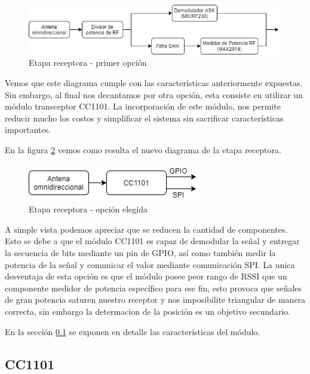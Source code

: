 \begin{figure}[htb]
	\centering
	\includegraphics[scale=0.6]{images/Opcion1.png}
    \caption{Etapa receptora - primer opción}
	\label{EtapaReceptora1}
\end{figure}


Vemos que este diagrama cumple con las características anteriormente expuestas. Sin embargo, al final nos decantamos por otra opción, 
esta consiste en utilizar un módulo transceptor CC1101. La incorporación de este módulo, nos permite reducir mucho los costos y simplificar
el sistema sin sacrificar características importantes. \par
En la figura \ref{EtapaReceptora2} vemos como resulta el nuevo diagrama de la etapa receptora. \par

\begin{figure}[htb]
	\centering
	\includegraphics[scale=0.6]{images/Opcion2.png}
    \caption{Etapa receptora - opción elegida}
	\label{EtapaReceptora2}
\end{figure}

A simple vista podemos apreciar que se reducen la cantidad de componentes. Esto se debe a que el módulo CC1101 es capaz de demodular la señal y
entregar la secuencia de bits mediante un pin de GPIO, así como también medir la potencia de la señal y comunicar el valor mediante comunicación SPI.
La unica desventaja de esta opción es que el módulo posee peor rango de RSSI que un componente medidor de potencia específico para ese fin,
esto provoca que señales de gran potencia saturen nuestro receptor y nos imposibilite triangular de manera correcta, sin embargo la determacion 
de la posición es un objetivo secundario. \par
En la sección \ref{cap:cc1101} se exponen en detalle las características del módulo.\par

\subsection{CC1101} \label{cap:cc1101}
